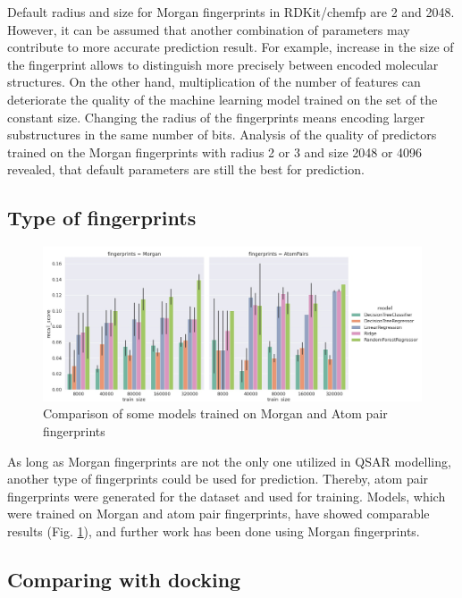 Default radius and size for Morgan fingerprints in RDKit/chemfp are 2 and 2048.
However, it can be assumed that another combination of parameters may contribute to more accurate prediction result.
For example, increase in the size of the fingerprint allows to distinguish more precisely between encoded molecular structures. On the other hand, multiplication of the number of features can deteriorate the quality of the machine learning model trained on the set of the constant size.
Changing the radius of the fingerprints means encoding larger substructures  in the same number of bits.
Analysis of the quality of predictors trained on the Morgan fingerprints with radius 2 or 3 and size 2048 or 4096 revealed, that default parameters are still the best for prediction.
\hfill\break
\subsection{Type of fingerprints}

\begin{figure}[H]
    \centering
    \includegraphics[width=\linewidth]{Images/MorganVSAtomPairs.jpg}
    \caption{Comparison of some models trained on Morgan and Atom pair fingerprints}
    \label{MvsAP}
\end{figure}

As long as Morgan fingerprints are not the only one utilized in QSAR modelling, another type of fingerprints could be used for prediction. 
Thereby, atom pair fingerprints were generated for the dataset and used for training. 
Models, which were trained on Morgan and atom pair fingerprints, have showed comparable results (Fig. \ref{MvsAP}), and further work has been done using Morgan fingerprints.

\hfill\break
\subsection{Comparing with docking}

